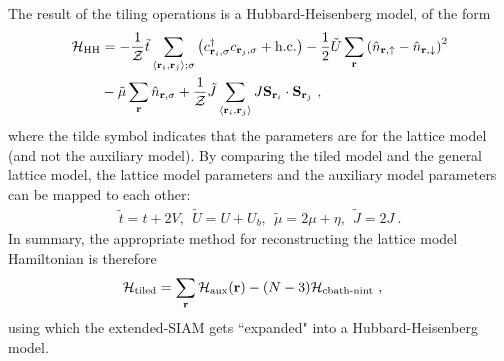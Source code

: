 \documentclass[reprint,hidelinks]{revtex4-2}
\begin{document}
The result of the tiling operations is a Hubbard-Heisenberg model, of the form
\begin{equation}\begin{aligned}
	\mathcal{H}_\text{HH} &= -\frac{1}{\mathcal{Z}}\tilde t\sum_{\left<{\bf r}_i, {\bf r}_j\right>;\sigma}\left(c^\dagger_{{\bf r}_i,\sigma}c_{{\bf r}_j,\sigma} + \text{h.c.}\right) - \frac{1}{2}\tilde U\sum_{\bf r}\left(\hat n_{{\bf r} , \uparrow} - \hat n_{{\bf r} , \downarrow}\right)^2 \\
						  &- \tilde \mu \sum_{{\bf r}}\hat n_{{\bf r},\sigma} + \frac{1}{\mathcal{Z}}\tilde J\sum_{\left< {\bf r}_i, {\bf r}_j\right>}J {\bf S}_{{\bf r}_i}\cdot{\bf S}_{{\bf r}_j}~,
\end{aligned}\end{equation}
where the tilde symbol indicates that the parameters are for the lattice model (and not the auxiliary model). By comparing the tiled model and the general lattice model, the lattice model parameters and the auxiliary model parameters can be mapped to each other:
\begin{equation}\begin{aligned}
	\tilde t = t+2V,~~ \tilde U = U + U_b, ~ ~ \tilde \mu = 2\mu + \eta,~ ~ \tilde J = 2J~.
\end{aligned}\end{equation}
In summary, the appropriate method for reconstructing the lattice model Hamiltonian is therefore
\begin{equation}\begin{aligned}\label{tilingPrescriptionFinal}
	\mathcal{H}_\text{tiled} &= \sum_{{\bf r}}\mathcal{H}_\text{aux}({\bf r}) - (N-3)\mathcal{H}_\text{cbath-nint}~,
\end{aligned}\end{equation}
using which the extended-SIAM gets ``expanded" into a Hubbard-Heisenberg model.
\end{document}
